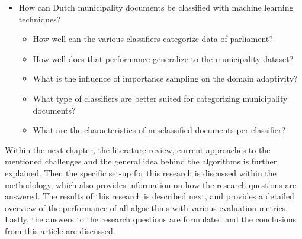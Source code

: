 \begin{itemize}
\item How can Dutch municipality documents be classified with machine learning techniques?  
\begin{itemize}
\item How well can the various classifiers categorize data of parliament?
\item How well does that performance generalize to the municipality dataset?
\item What is the influence of importance sampling on the domain adaptivity?
\item What type of classifiers are better suited for categorizing municipality documents?
\item What are the characteristics of misclassified documents per classifier?
\end{itemize}
\end{itemize}
Within the next chapter, the literature review, current approaches to the mentioned challenges and the general idea behind the algorithms is further explained. Then the specific set-up for this research is discussed within the methodology, which also provides information on how the research questions are answered. The results of this research is described next, and provides a detailed overview of the performance of all algorithms with various evaluation metrics. Lastly, the answers to the research questions are formulated and the conclusions from this article are discussed.


